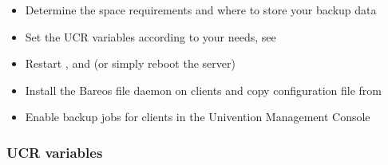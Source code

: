  \begin{itemize}
  \item Determine the space requirements and where to store your backup data
  \item Set the  UCR variables according to your needs, see 
  \item Restart ,  and  (or simply reboot the server)
  \item Install the Bareos file daemon on clients and copy configuration file from 
  \item Enable backup jobs for clients in the Univention Management Console
 \end{itemize}

\subsubsection{UCR variables}
\label{sec:UCR}

